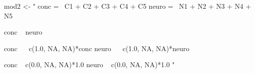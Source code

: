 \begin{Schunk}
\begin{Sinput}
 mod2 <- "
 conc =~ C1 + C2 + C3 + C4 + C5
 neuro =~ N1 + N2 + N3 + N4 + N5
 
 conc ~ neuro
 
 conc ~~ c(1.0, NA, NA)*conc
 neuro ~~ c(1.0, NA, NA)*neuro
 
 conc ~ c(0.0, NA, NA)*1.0
 neuro ~ c(0.0, NA, NA)*1.0
 "
\end{Sinput}
\end{Schunk}
